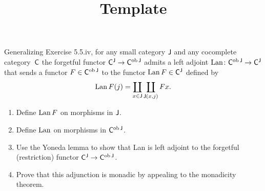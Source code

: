 \documentclass[../../solutions]{subfiles}
\title{Template}
\author{}
\begin{document}
\maketitle

%   

\begin{exercise}
  Generalizing Exercise 5.5.iv, for any small category ${\mathsf{J}}$ and any
  cocomplete category~${\mathsf{C}}$ the forgetful functor ${\mathsf{C}}^{\mathsf{J}} \to
  {\mathsf{C}}^{\operatorname{ob}{\mathsf{J}}}$ admits a left adjoint
  ${\operatorname{Lan}}\colon{{\mathsf{C}}^{\operatorname{ob}{\mathsf{J}}}}\to{{\mathsf{C}}^{\mathsf{J}}}$ that sends a functor $F\in
  {\mathsf{C}}^{\operatorname{ob}{\mathsf{J}}}$ to the functor $\operatorname{Lan} F\in {\mathsf{C}}^{\mathsf{J}}$ defined by
  $$\operatorname{Lan} F(j) = \coprod_{x\in{\mathsf{J}}\vphantom{j}}\coprod_{{\mathsf{J}}(x,j)} Fx.$$
  \begin{enumerate}[label=(\roman*)]
  \item Define $\operatorname{Lan} F$ on morphisms in ${\mathsf{J}}$.
  \item Define $\operatorname{Lan}$ on morphisms in ${\mathsf{C}}^{\operatorname{ob}{\mathsf{J}}}$.
  \item Use the Yoneda lemma to show that Lan is left adjoint to the
    forgetful (restriction) functor ${\mathsf{C}}^{\mathsf{J}}\to {\mathsf{C}}^{\operatorname{ob}{\mathsf{J}}}$.
  \item Prove that this adjunction is monadic by appealing to
    the monadicity theorem.
  \end{enumerate}
\end{exercise}
\end{document}
